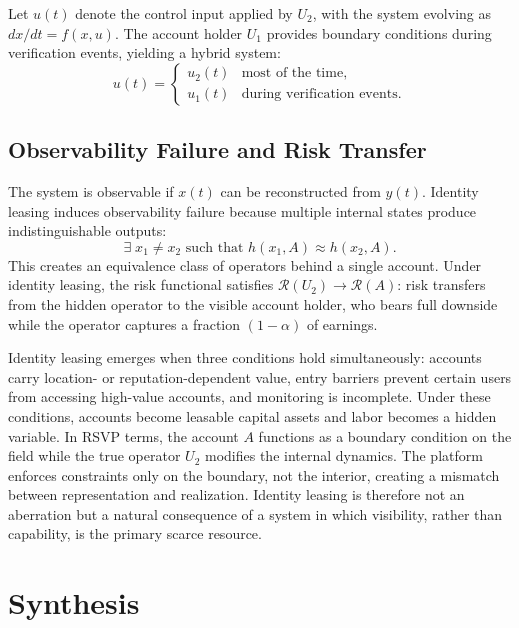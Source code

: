 \documentclass[11pt]{article}
\begin{document}
Let $u(t)$ denote the control input applied by $U_2$, with the system
evolving as $dx/dt = f(x, u)$. The account holder $U_1$ provides boundary
conditions during verification events, yielding a hybrid system:
\[
u(t) =
\begin{cases}
u_2(t) & \text{most of the time,} \\
u_1(t) & \text{during verification events.}
\end{cases}
\]

\subsection{Observability Failure and Risk Transfer}

The system is observable if $x(t)$ can be reconstructed from $y(t)$.
Identity leasing induces observability failure because multiple internal
states produce indistinguishable outputs:
\[
\exists\; x_1 \neq x_2 \text{ such that } h(x_1, A) \approx h(x_2, A).
\]
This creates an equivalence class of operators behind a single account.
Under identity leasing, the risk functional satisfies
$\mathcal{R}(U_2) \to \mathcal{R}(A)$: risk transfers from the hidden
operator to the visible account holder, who bears full downside while the
operator captures a fraction $(1-\alpha)$ of earnings.

Identity leasing emerges when three conditions hold simultaneously: accounts
carry location- or reputation-dependent value, entry barriers prevent certain
users from accessing high-value accounts, and monitoring is incomplete. Under
these conditions, accounts become leasable capital assets and labor becomes
a hidden variable. In RSVP terms, the account $A$ functions as a boundary
condition on the field while the true operator $U_2$ modifies the internal
dynamics. The platform enforces constraints only on the boundary, not the
interior, creating a mismatch between representation and realization.
Identity leasing is therefore not an aberration but a natural consequence
of a system in which visibility, rather than capability, is the primary
scarce resource.

\section{Synthesis}
\label{sec:synthesis}
\end{document}
